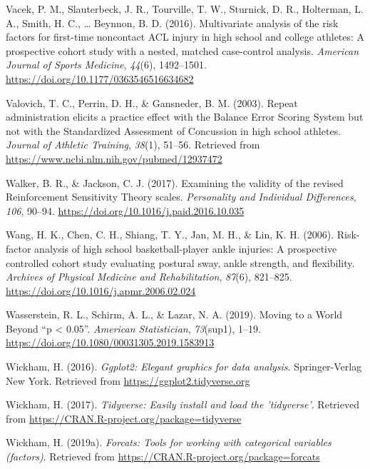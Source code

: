 \documentclass[
  english,
  man,floatsintext]{apa6}
\begin{document}
\leavevmode\hypertarget{ref-Vacek2016}{}%
Vacek, P. M., Slauterbeck, J. R., Tourville, T. W., Sturnick, D. R., Holterman, L. A., Smith, H. C., \ldots{} Beynnon, B. D. (2016). Multivariate analysis of the risk factors for first-time noncontact ACL injury in high school and college athletes: A prospective cohort study with a nested, matched case-control analysis. \emph{American Journal of Sports Medicine}, \emph{44}(6), 1492--1501. \url{https://doi.org/10.1177/0363546516634682}

\leavevmode\hypertarget{ref-Valovich2003}{}%
Valovich, T. C., Perrin, D. H., \& Gansneder, B. M. (2003). Repeat administration elicits a practice effect with the Balance Error Scoring System but not with the Standardized Assessment of Concussion in high school athletes. \emph{Journal of Athletic Training}, \emph{38}(1), 51--56. Retrieved from \url{https://www.ncbi.nlm.nih.gov/pubmed/12937472}

\leavevmode\hypertarget{ref-Walker2017}{}%
Walker, B. R., \& Jackson, C. J. (2017). Examining the validity of the revised Reinforcement Sensitivity Theory scales. \emph{Personality and Individual Differences}, \emph{106}, 90--94. \url{https://doi.org/10.1016/j.paid.2016.10.035}

\leavevmode\hypertarget{ref-Wang2006}{}%
Wang, H. K., Chen, C. H., Shiang, T. Y., Jan, M. H., \& Lin, K. H. (2006). Risk-factor analysis of high school basketball-player ankle injuries: A prospective controlled cohort study evaluating postural sway, ankle strength, and flexibility. \emph{Archives of Physical Medicine and Rehabilitation}, \emph{87}(6), 821--825. \url{https://doi.org/10.1016/j.apmr.2006.02.024}

\leavevmode\hypertarget{ref-Wasserstein2019}{}%
Wasserstein, R. L., Schirm, A. L., \& Lazar, N. A. (2019). Moving to a World Beyond ``p \textless{} 0.05''. \emph{American Statistician}, \emph{73}(sup1), 1--19. \url{https://doi.org/10.1080/00031305.2019.1583913}

\leavevmode\hypertarget{ref-R-ggplot2}{}%
Wickham, H. (2016). \emph{Ggplot2: Elegant graphics for data analysis}. Springer-Verlag New York. Retrieved from \url{https://ggplot2.tidyverse.org}

\leavevmode\hypertarget{ref-R-tidyverse}{}%
Wickham, H. (2017). \emph{Tidyverse: Easily install and load the 'tidyverse'}. Retrieved from \url{https://CRAN.R-project.org/package=tidyverse}

\leavevmode\hypertarget{ref-R-forcats}{}%
Wickham, H. (2019a). \emph{Forcats: Tools for working with categorical variables (factors)}. Retrieved from \url{https://CRAN.R-project.org/package=forcats}
\end{document}
